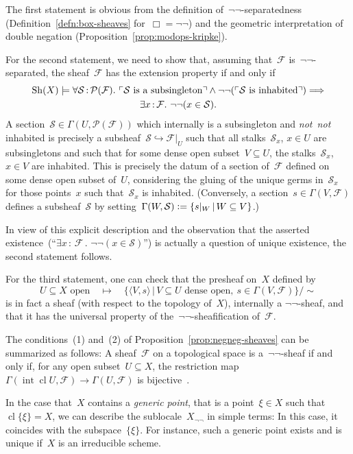\documentclass[10pt,reqno,a4paper]{amsbook}
\makeatletter
\theoremstyle{definition}
\theoremstyle{plain}
\theoremstyle{remark}
\newcommand{\F}{\mathcal{F}}
\renewcommand{\P}{\mathcal{P}}
\renewcommand{\S}{\mathcal{S}}
\newcommand{\Sh}{\mathrm{Sh}}
\DeclareMathOperator{\Int}{int}
\DeclareMathOperator{\Clos}{cl}
\newcommand{\?}{\,{:}\,}
\renewcommand{\_}{\mathpunct{.}\,}
\newcommand{\speak}[1]{\ulcorner\text{\textnormal{#1}}\urcorner}
\newcommand{\notnot}{\emph{not~not}\xspace}
\newcommand{\defeq}{\vcentcolon=}
\renewenvironment{proof}[1][\proofname]{\par
  \pushQED{\qed}%
  \normalfont \topsep6\p@\@plus6\p@\relax
  \trivlist
  \item[\hskip\labelsep
        \itshape
    #1\@addpunct{.}]\ignorespaces
}{%
  \popQED\endtrivlist\@endpefalse
}
\makeatother
\begin{document}
\begin{proof}
The first statement is obvious from the definition of~$\neg\neg$-separatedness
(Definition~\ref{defn:box-sheaves} for~$\Box = \neg\neg$) and the geometric
interpretation of double negation (Proposition~\ref{prop:modops-kripke}).

For the second statement, we need to show that, assuming that~$\F$
is~$\neg\neg$-separated, the sheaf~$\F$ has the extension property if and only if
\begin{multline*}
  \Sh(X) \models \forall \S \? \P(\F)\_
  \speak{$\S$ is a subsingleton} \wedge
  \neg\neg(\speak{$\S$ is inhabited}) \Longrightarrow \\
  \exists x\?\F\_ \neg\neg(x \in \S).
\end{multline*}
A section~$\S \in \Gamma(U,\P(\F))$ which internally is a
subsingleton and \notnot inhabited is precisely a subsheaf~$\S \hookrightarrow
\F|_U$ such that all stalks~$\S_x$, $x \in U$ are subsingletons and such that for
some dense open subset~$V \subseteq U$, the stalks~$\S_x$, $x \in V$ are
inhabited. This is precisely the datum of a section of~$\F$ defined on some
dense open subset of~$U$, considering the gluing of the unique germs in~$\S_x$ for
those points~$x$ such that~$\S_x$ is inhabited. (Conversely, a section~$s \in
\Gamma(V,\F)$ defines a subsheaf~$\S$ by setting~$\Gamma(W,\S) \defeq \{ s|_W \,|\,
W \subseteq V \}$.)

In view of this explicit description and the observation that the asserted
existence~(``$\exists x\?\F\_ \neg\neg(x \in \S)$'') is actually a question of
unique existence, the second statement follows.

For the third statement, one can check that the presheaf on~$X$ defined by
\[ \text{$U \subseteq X$ open} \quad\longmapsto\quad
  \{ \langle V,s \rangle \,|\, \text{$V \subseteq U$ dense open},\ s \in \Gamma(V,\F)
  \}/{\sim} \]
is in fact a sheaf (with respect to the topology of~$X$), internally a $\neg\neg$-sheaf,
and that it has the universal property of the~$\neg\neg$-sheafification
of~$\F$.
\end{proof}

The conditions~(1) and~(2) of Proposition~\ref{prop:negneg-sheaves} can be
summarized as follows: A sheaf~$\F$ on a topological space is
a~$\neg\neg$-sheaf if and only if, for any open subset~$U \subseteq X$, the
restriction map~$\Gamma(\Int\Clos U, \F) \to \Gamma(U,\F)$ is
bijective~\cite[Lemma~36]{jackson:sheaf-theoretic-measure-theory}.

In the case that~$X$ contains a \emph{generic point}, that is a point~$\xi \in X$
such that~$\Clos\{\xi\} = X$, we can describe the sublocale~$X_{\neg\neg}$ in
simple terms: In this case, it coincides with the subspace~$\{\xi\}$.
For instance, such a generic point exists and is unique if~$X$ is an irreducible scheme.
\end{document}

